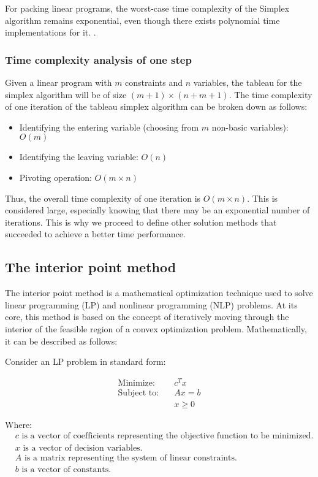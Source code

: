 For packing linear programs, the worst-case time complexity of the Simplex algorithm
remains exponential, even though there exists polynomial time implementations for it.
\parencite{stille2010solution}.

\subsubsection{Time complexity analysis of one step}
Given a linear program with \( m \) constraints and \( n \) variables, the tableau for the
simplex algorithm will be of size \( (m+1) \times (n+m+1) \).
The time complexity of one iteration of the tableau simplex algorithm can be broken down as follows:

\begin{itemize}
    \item Identifying the entering variable (choosing from $m$ non-basic variables): \( O(m) \)
    \item Identifying the leaving variable: \( O(n) \)
    \item Pivoting operation: \( O(m \times n) \)
\end{itemize}

Thus, the overall time complexity of one iteration is \( O(m \times n) \).
This is considered large, especially knowing that there may be an
exponential number of iterations. This is why we proceed to define
other solution methods that
succeeded to achieve a better time performance.

\subsection{The interior point method}
The interior point method is a mathematical optimization
technique used to solve linear programming (LP) and
nonlinear programming (NLP) problems.
At its core, this method is based on the concept of iteratively
moving through the interior of the feasible region of a convex
optimization problem. Mathematically, it can be described as follows:

Consider an LP problem in standard form:

\[
    \begin{aligned}
        \text{Minimize:} \quad   & c^Tx     \\
        \text{Subject to:} \quad & Ax = b   \\
                                 & x \geq 0
    \end{aligned}
\]

Where:
\begin{align*}
     & c \text{ is a vector of coefficients representing the objective function to be minimized.} \\
     & x \text{ is a vector of decision variables.}                                               \\
     & A \text{ is a matrix representing the system of linear constraints.}                       \\
     & b \text{ is a vector of constants.}
\end{align*}

